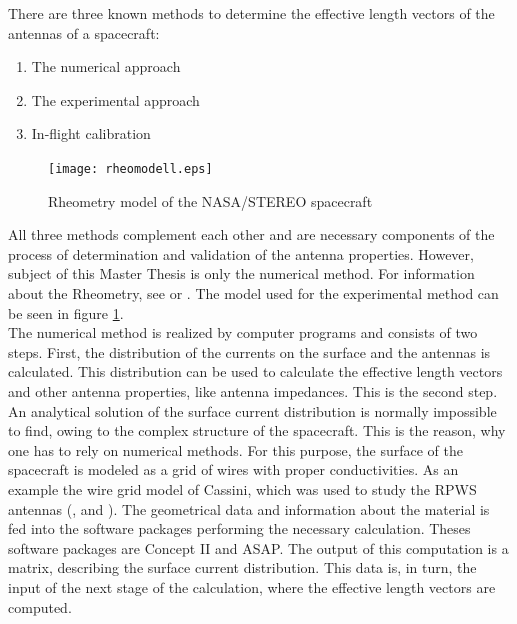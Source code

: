 \documentclass[a4paper,14pt]{extbook}
\begin{document}
There are three known methods to determine the effective length vectors of the antennas of a spacecraft:

\begin{enumerate}
\item The numerical approach
\item The experimental approach
\item In-flight calibration
\end{enumerate}

\begin{figure}
\begin{center}  %
  \texttt{[image: rheomodell.eps]}\\
\caption{Rheometry model of the NASA/STEREO spacecraft}\label{fig_rheomod}
\end{center}
\end{figure}


All three methods complement each other and are necessary components of the process of determination and validation of the antenna properties. However, subject of this Master Thesis is only the numerical method. For information about the Rheometry, see
\cite{rheometry} or \cite{macher_dipl}. The model used for the experimental method can be seen in figure \ref{fig_rheomod}.\\

The numerical method is realized by computer programs and consists of two steps. First, the distribution of the currents on the surface and the antennas is calculated. This distribution can be used to calculate the effective length vectors and other antenna properties, like antenna impedances. This is the second step.\\

An analytical solution of the surface current distribution is normally impossible to find, owing to the complex structure of the spacecraft. This is the reason, why one has to rely on numerical methods. For this purpose, the surface of the spacecraft is modeled as a grid of wires with proper conductivities. As an example the wire grid model of Cassini, which was used to study the RPWS antennas (\cite{cassini},
 \cite{cassini2} and
 \cite{cassini3}). The geometrical data and information about the material is fed into the software packages performing the necessary calculation. Theses software packages are Concept II and ASAP. The output of this computation is a matrix, describing the surface current distribution. This data is, in turn, the input of the next stage of the calculation, where the effective length vectors are computed.\\
\end{document}
